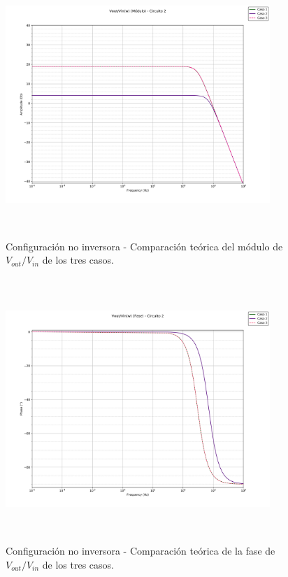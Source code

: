 \begin{figure}[H] %
\centering
\includegraphics[width=10cm,height=10cm,keepaspectratio]{../EJ1/00GRAFICOS/teoricos/circ2voviw.png}
\caption{Configuración no inversora - Comparaci\'on te\'orica del m\'odulo de$V_{out}/V_{in}$ de los tres casos.}
\label{c2voviTeoMod}
\end{figure}

\begin{figure}[H] %
\centering
\includegraphics[width=10cm,height=10cm,keepaspectratio]{../EJ1/00GRAFICOS/teoricos/circ2vovifasew.png}
\caption{Configuración no inversora - Comparaci\'on te\'orica de la fase de $V_{out}/V_{in}$ de los tres casos.}
\label{c2voviTeoPh}
\end{figure}

